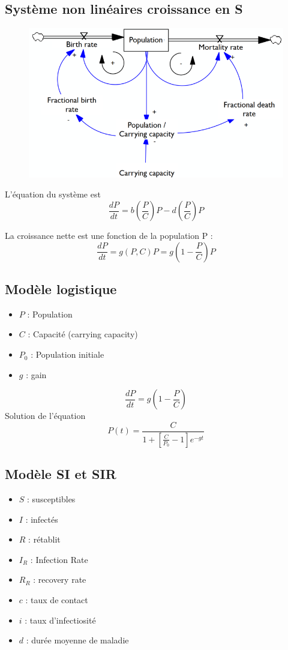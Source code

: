 \documentclass[resume]{subfiles}
\begin{document}
\subsection{Système non linéaires croissance en S}

\begin{figure}[H]
    \centering
    \includegraphics[width=1\columnwidth]{Figures/FDM_3.png}
\end{figure}

L'équation du système est
$$\frac{dP}{dt}=b(\frac{P}{C})P-d(\frac{P}{C})P$$

La croissance nette est une fonction de la population P :
$$\frac{dP}{dt}=g(P,C)P=g(1-\frac{P}{C})P$$


\subsection{Modèle logistique}
\begin{itemize}
\item $P$ : Population
\item $C$ : Capacité (carrying capacity)
\item $P_0$ : Population initiale
\item $g$ : gain
\end{itemize}
$$\frac{dP}{dt}=g(1-\frac{P}{C})$$
Solution de l'équation 
$$P(t)= \frac{C}{1+[\frac{C}{P_0}-1]e^{-gt}}$$

\subsection{Modèle SI et SIR}
\begin{itemize}
\item $S$ : susceptibles
\item $I$ : infectés
\item $R$ : rétablit
\item $I_R$ : Infection Rate
\item $R_R$ : recovery rate
\item $c$ : taux de contact
\item $i$ : taux d'infectiosité
\item $d$ : durée moyenne de maladie
\end{itemize}
\end{document}
